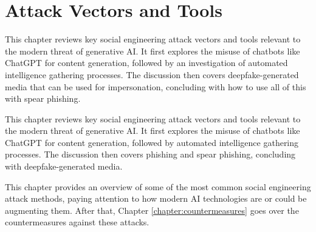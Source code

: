 



\chapter{Attack Vectors and Tools \label{chapter:attacks}}
\begin{comment}

Guides:
    - About 3-4 pages

TODO:
    [ ] 

What to cover:
    - Attacks
        - Deepfake generated synthetic media
            - Videos
            - Images
            - Audio
            - Real-time voice morphing

Sections:
    - Attack Vectors and Tools
        - Chatbots
        - Automated intelligence gathering
        - Deepfake-generated media
        - Phishing & spear phishing

\end{comment}

This chapter reviews key social engineering attack vectors and tools relevant to the modern threat of generative AI. It first explores the misuse of chatbots like ChatGPT for content generation, followed by an investigation of automated intelligence gathering processes. The discussion then covers deepfake-generated media that can be used for impersonation, concluding with how to use all of this with spear phishing.

This chapter reviews key social engineering attack vectors and tools relevant to the modern threat of generative AI. It first explores the misuse of chatbots like ChatGPT for content generation, followed by automated intelligence gathering processes. The discussion then covers phishing and spear phishing, concluding with deepfake-generated media.

This chapter provides an overview of some of the most common social engineering attack methods, paying attention to how modern AI technologies are or could be augmenting them. After that, Chapter \ref{chapter:countermeasures} goes over the countermeasures against these attacks.














